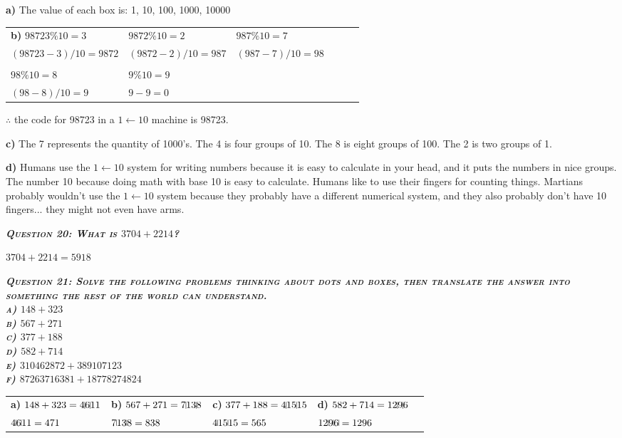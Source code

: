 \documentclass{article}
\begin{document}
\textbf{a)} The value of each box is: 1, 10, 100, 1000, 10000

\begin{tabular}{l l l l l l}
    \textbf{b)} $98723\%10=3$ & $9872\%10=2$ & $987\%10=7$ 
    & \\ 
    $(98723-3)/10=9872$ & $(9872-2)/10=987$ & $(987-7)/10=98$ 
    & \\ \\
    $98\%10=8$ & $9\%10=9$
    & \\
    $(98-8)/10=9$ & $9-9=0$
\end{tabular}

$\therefore$ the code for 98723 in a $1 \leftarrow 10$ machine is 98723.

\textbf{c)} The 7 represents the quantity of 1000's. The 4 is four groups of 10. The 8 is eight groups of 100. The 2 is two groups of 1.

\textbf{d)} Humans use the $1 \leftarrow 10$ system for writing numbers because it is easy to calculate in your head, and it puts the numbers in nice groups. The number 10 because doing math with base 10 is easy to calculate. Humans like to use their fingers for counting things. Martians probably wouldn't use the $1 \leftarrow 10$ system because they probably have a different numerical system, and they also probably don't have 10 fingers... they might not even have arms.

\textbf{\emph{\textsc{Question 20: What is $3704+2214$?}}}

$3704+2214=5918$

\textbf{\emph{\textsc{Question 21: Solve the following problems thinking about dots and boxes, then translate the answer into something the rest of the world can understand. \\
a) $148+323$ \\
b) $567+271$ \\
c) $377+188$ \\
d) $582+714$ \\
e) $310462872+389107123$ \\
f) $87263716381+18778274824$}}}

\begin{tabular}{l l l l l}
    \textbf{a)} $148+323=4\vline6\vline11$ & \textbf{b)} $567+271=7\vline13\vline8$ & \textbf{c)} $377+188=4\vline15\vline15$ & \textbf{d)} $582+714=12\vline9\vline6$
    & \\
    $4\vline6\vline11=471$ & $7\vline13\vline8=838$ & $4\vline15\vline15=565$ & $12\vline9\vline6\vline=1296$
    & \\
\end{tabular}
\end{document}
